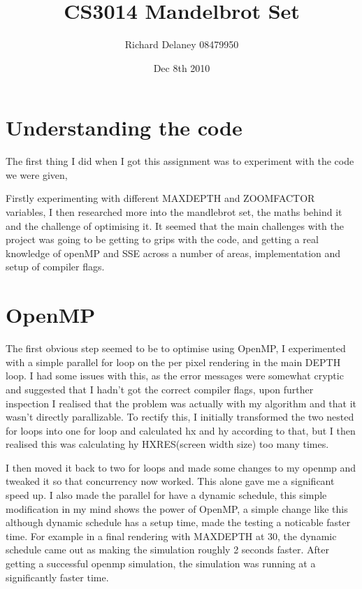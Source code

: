 \documentclass{article}
\title{ CS3014 Mandelbrot Set}
\author{ Richard Delaney 08479950}
\date{ Dec 8th 2010}
\begin{document}
 \maketitle 


\section*{ Understanding the code}


The first thing I did when I got this assignment was to experiment with the code we were given, 

Firstly experimenting with different MAX\textunderscore DEPTH and ZOOM\textunderscore FACTOR variables, I then researched more into the mandlebrot set, the maths behind it and the challenge of optimising it. It seemed that the main challenges with the project was going to be getting to grips with the code, and getting a real knowledge of openMP and SSE across a number of areas, implementation and setup of compiler flags.



\section*{ OpenMP}


The first obvious step seemed to be to optimise using OpenMP, I experimented with a simple parallel for loop on the per pixel rendering in the main DEPTH loop. I had some issues with this, as the error messages were somewhat cryptic and suggested that I hadn't got the correct compiler flags, upon further inspection I realised that the problem was actually with my algorithm and that it wasn't directly parallizable. To rectify this, I initially transformed the two nested for loops into one for loop and calculated hx and hy according to that, but I then realised this was calculating hy HXRES(screen width size) too many times.



I then moved it back to two for loops and made some changes to my openmp and tweaked it so that concurrency now worked. This alone gave me a significant speed up. I also made the parallel for have a dynamic schedule, this simple modification in my mind shows the power of OpenMP, a simple change like this although dynamic schedule has a setup time, made the testing a noticable faster time. For example in a final rendering with MAX\textunderscore DEPTH at 30, the dynamic schedule came out as making the simulation roughly 2 seconds faster. After getting a successful openmp simulation, the simulation was running at a significantly faster time.
\end{document}
